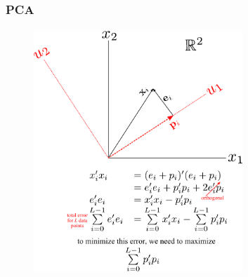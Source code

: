 \begin{frame}
\frametitle{PCA}
\framesubtitle{}
\logoCSIPCPL\mypagenum
\begin{figure}		
\includegraphics[width=0.7\textwidth]{thesis/PRML_PCA_geometricDerivation_step1.pdf}			
\end{figure}
\end{frame}







